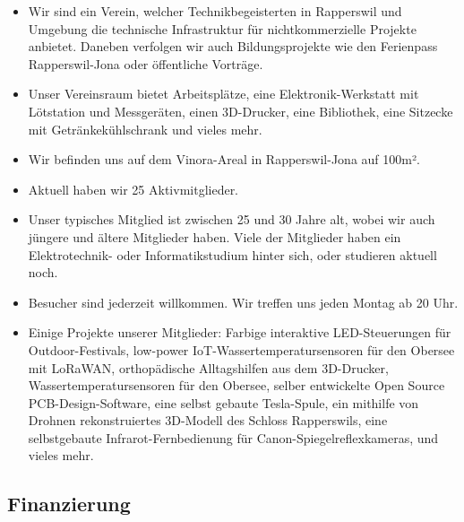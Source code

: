 \documentclass[10pt,a4paper,parskip,fleqn]{scrartcl}
\newcommand{\membercount}{25}
\begin{document}
\begin{itemize}
	\item Wir sind ein Verein, welcher Technikbegeisterten in Rapperswil und
		Umgebung die technische Infrastruktur für nichtkommerzielle Projekte
		anbietet. Daneben verfolgen wir auch Bildungsprojekte wie den Ferienpass
		Rapperswil-Jona oder öffentliche Vorträge.
	\item Unser Vereinsraum bietet Arbeitsplätze, eine Elektronik-Werkstatt mit
		Lötstation und Messgeräten, einen 3D-Drucker, eine Bibliothek, eine Sitzecke
		mit Getränkekühlschrank und vieles mehr.
	\item Wir befinden uns auf dem Vinora-Areal in Rapperswil-Jona auf 100m².
	\item Aktuell haben wir \membercount{} Aktivmitglieder.
	\item Unser typisches Mitglied ist zwischen 25 und 30 Jahre alt, wobei wir
		auch jüngere und ältere Mitglieder haben. Viele der Mitglieder haben ein
		Elektrotechnik- oder Informatikstudium hinter sich, oder studieren aktuell
		noch.
	\item Besucher sind jederzeit willkommen. Wir treffen uns jeden Montag ab 20
		Uhr.
	\item Einige Projekte unserer Mitglieder: Farbige interaktive LED-Steuerungen
		für Outdoor-Festivals, low-power IoT-Wassertemperatursensoren für den
		Obersee mit LoRaWAN, orthopädische Alltagshilfen aus dem 3D-Drucker,
		Wassertemperatursensoren für den Obersee, selber entwickelte Open Source
		PCB-Design-Software, eine selbst gebaute Tesla-Spule, ein mithilfe von
		Drohnen rekonstruiertes 3D-Modell des Schloss Rapperswils, eine
		selbstgebaute Infrarot-Fernbedienung für Canon-Spiegelreflexkameras, und
		vieles mehr.
\end{itemize}

\subsection{Finanzierung}
\end{document}
